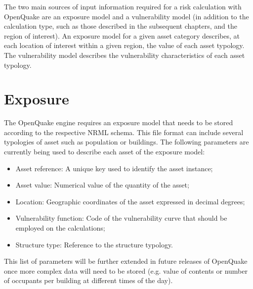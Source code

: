 The two main sources of input information required for a risk calculation with OpenQuake are an exposure model and a vulnerability model (in addition to the calculation type, such as those described in the subsequent chapters, and the region of interest). An exposure model for a given asset category describes, at each location of interest within a given region, the value of each asset typology. The vulnerability model describes the vulnerability characteristics of each asset typology.
\section{Exposure}
The OpenQuake engine requires an exposure model that needs to be stored according to the respective NRML schema. This file format can include several typologies of asset such as population or buildings. The following parameters are currently being used to describe each asset of the exposure model: 

\begin{itemize}
\item Asset reference: A unique key used to identify the asset instance;
\item Asset value: Numerical value of the quantity of the asset;
\item Location: Geographic coordinates of the asset expressed in decimal degrees;
\item Vulnerability function: Code of the vulnerability curve that should be employed on the calculations;
\item Structure type: Reference to the structure typology.
\end{itemize}

This list of parameters will be further extended in future releases of OpenQuake once more complex data will need to be stored (e.g. value of contents or number of occupants per building at different times of the day).  

